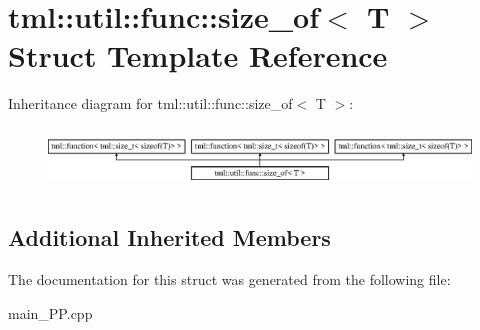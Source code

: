 \hypertarget{structtml_1_1util_1_1func_1_1size__of}{\section{tml\+:\+:util\+:\+:func\+:\+:size\+\_\+of$<$ T $>$ Struct Template Reference}
\label{structtml_1_1util_1_1func_1_1size__of}
}
Inheritance diagram for tml\+:\+:util\+:\+:func\+:\+:size\+\_\+of$<$ T $>$\+:\begin{figure}[H]
\begin{center}
\leavevmode
\includegraphics[height=1.623188cm]{structtml_1_1util_1_1func_1_1size__of}
\end{center}
\end{figure}
\subsection*{Additional Inherited Members}


The documentation for this struct was generated from the following file\+:\begin{DoxyCompactItemize}
\item 
main\+\_\+\+P\+P.\+cpp\end{DoxyCompactItemize}
